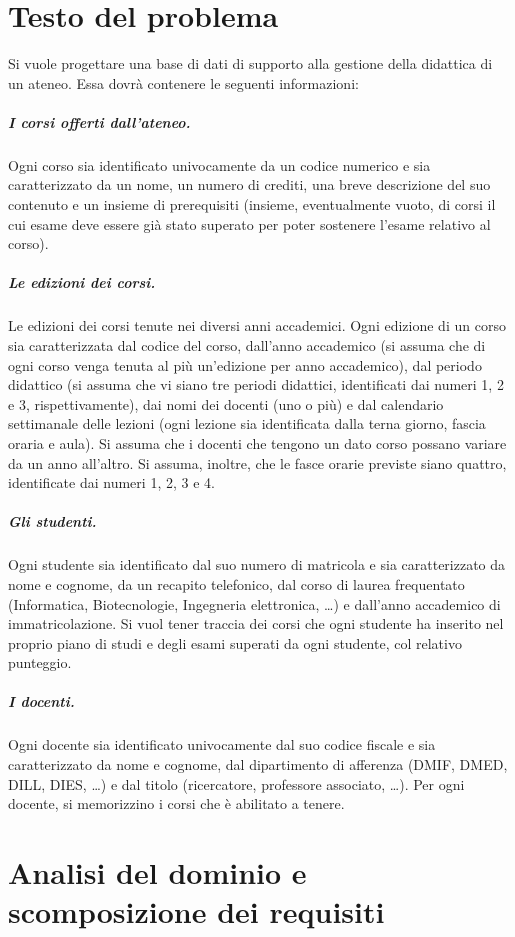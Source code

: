 \section{Testo del problema}
\label{sec:testo-del-problema}

Si vuole progettare una base di dati di supporto alla gestione della didattica di un ateneo. Essa dovrà contenere le seguenti informazioni:

\subparagraph{I corsi offerti dall'ateneo.} Ogni corso sia identificato univocamente da un codice numerico e sia caratterizzato da un nome, un numero di crediti, una breve descrizione del suo contenuto e un insieme di prerequisiti (insieme, eventualmente vuoto, di corsi il cui esame deve essere già stato superato per poter sostenere l'esame relativo al corso).
\subparagraph{Le edizioni dei corsi.} Le edizioni dei corsi tenute nei diversi anni accademici. Ogni edizione di un corso sia caratterizzata dal codice del corso, dall'anno accademico (si assuma che di ogni corso venga tenuta al più un'edizione per anno accademico), dal periodo didattico (si assuma che vi siano tre periodi didattici, identificati dai numeri 1, 2 e 3, rispettivamente), dai nomi dei docenti (uno o più) e dal calendario settimanale delle lezioni (ogni lezione sia identificata dalla terna giorno, fascia oraria e aula). Si assuma che i docenti che tengono un dato corso possano variare da un anno all'altro. Si assuma, inoltre, che le fasce orarie previste siano quattro, identificate dai numeri 1, 2, 3 e 4.
\subparagraph{Gli studenti.} Ogni studente sia identificato dal suo numero di matricola e sia caratterizzato da nome e cognome, da un recapito telefonico, dal corso di laurea frequentato (Informatica, Biotecnologie, Ingegneria elettronica, \dots) e dall'anno accademico di immatricolazione. Si vuol tener traccia dei corsi che ogni studente ha inserito nel proprio piano di studi e degli esami superati da ogni studente, col relativo punteggio.
\subparagraph{I docenti.} Ogni docente sia identificato univocamente dal suo codice fiscale e sia caratterizzato da nome e cognome, dal dipartimento di afferenza (DMIF, DMED, DILL, DIES, \dots) e dal titolo (ricercatore, professore associato, \dots). Per ogni docente, si memorizzino i corsi che è abilitato a tenere.

\section{Analisi del dominio e scomposizione dei requisiti}
\label{sec:analisi-del-dominio-e-scomposizione-dei-requisiti}


